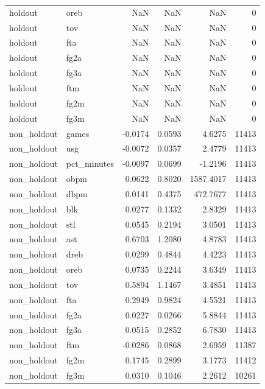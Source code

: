 \begin{table}
\begin{tabular}{llrrrr}
holdout & oreb & NaN & NaN & NaN & 0 \\
holdout & tov & NaN & NaN & NaN & 0 \\
holdout & fta & NaN & NaN & NaN & 0 \\
holdout & fg2a & NaN & NaN & NaN & 0 \\
holdout & fg3a & NaN & NaN & NaN & 0 \\
holdout & ftm & NaN & NaN & NaN & 0 \\
holdout & fg2m & NaN & NaN & NaN & 0 \\
holdout & fg3m & NaN & NaN & NaN & 0 \\
non\_holdout & games & -0.0174 & 0.0593 & 4.6275 & 11413 \\
non\_holdout & usg & -0.0072 & 0.0357 & 2.4779 & 11413 \\
non\_holdout & pct\_minutes & -0.0097 & 0.0699 & -1.2196 & 11413 \\
non\_holdout & obpm & 0.0622 & 0.8020 & 1587.4017 & 11413 \\
non\_holdout & dbpm & 0.0141 & 0.4375 & 472.7677 & 11413 \\
non\_holdout & blk & 0.0277 & 0.1332 & 2.8329 & 11413 \\
non\_holdout & stl & 0.0545 & 0.2194 & 3.0501 & 11413 \\
non\_holdout & ast & 0.6703 & 1.2080 & 4.8783 & 11413 \\
non\_holdout & dreb & 0.0299 & 0.4844 & 4.4223 & 11413 \\
non\_holdout & oreb & 0.0735 & 0.2244 & 3.6349 & 11413 \\
non\_holdout & tov & 0.5894 & 1.1467 & 3.4851 & 11413 \\
non\_holdout & fta & 0.2949 & 0.9824 & 4.5521 & 11413 \\
non\_holdout & fg2a & 0.0227 & 0.0266 & 5.8844 & 11413 \\
non\_holdout & fg3a & 0.0515 & 0.2852 & 6.7830 & 11413 \\
non\_holdout & ftm & -0.0286 & 0.0868 & 2.6959 & 11387 \\
non\_holdout & fg2m & 0.1745 & 0.2899 & 3.1773 & 11412 \\
non\_holdout & fg3m & 0.0310 & 0.1046 & 2.2612 & 10261 \\
\bottomrule
\end{tabular}
\end{table}
